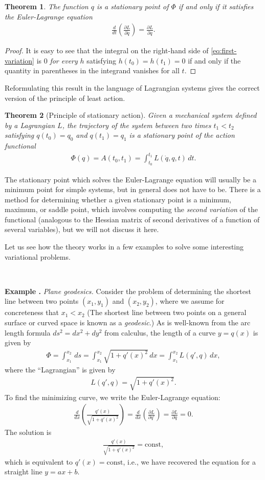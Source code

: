 \documentclass[12pt]{amsart}
\newcommand{\eqst}[1]{\begin{align*}#1\end{align*}}
\newcommand{\der}[2]{\frac{d#1}{d#2}}
\newcommand{\pder}[2]{\frac{\partial#1}{\partial#2}}
\newtheorem{thm}{Theorem}
\newcounter{example}
\newcommand{\beginexample}[1]{\ \\ \addtocounter{example}{1} \textbf{Example \arabic{example}.} \textit{#1.}}
\begin{document}
\begin{thm}
The function $q$ is a stationary point of $\Phi$ if and only if it satisfies the Euler-Lagrange equation
\eqst{
\frac{d}{dt}\left( \frac{\partial L}{\partial \dot{q}} \right) = \frac{\partial L}{\partial q}.
}
\end{thm}

\begin{proof}
It is easy to see that the integral on the right-hand side of 
\eqref{eq:first-variation} is $0$ \emph{for every} $h$ satisfying $h(t_0)=h(t_1)=0$ if and only if the quantity in parentheses in the integrand vanishes for all $t$.
\end{proof}

Reformulating this result in the language of Lagrangian systems gives the correct version of the principle of least action.

\begin{thm}[Principle of stationary action]
Given a mechanical system defined by a Lagrangian $L$, the trajectory of the system between two times $t_1<t_2$ satisfying $q(t_0)=q_0$ and $q(t_1)=q_1$ is a stationary point of the action functional
\eqst{
\Phi(q) = A(t_0,t_1) = \int_{t_0}^{t_1} L(\dot{q},q,t)\,dt.
}
\end{thm}

The stationary point which solves the Euler-Lagrange equation will usually be a minimum point for simple systems, but in general does not have to be. There is a method for determining whether a given stationary point is a minimum, maximum, or saddle point, which involves computing the \emph{second variation} of the functional (analogous to the Hessian matrix of second derivatives of a function of several variables), but we will not discuss it here.

Let us see how the theory works in a few examples to solve some interesting variational problems.

\beginexample{Plane geodesics} Consider the problem of determining the shortest line between two points $(x_1,y_1)$ and $(x_2,y_2)$, where we assume for concreteness that $x_1<x_2$ (The shortest line between two points on a general surface or curved space is known as a \emph{geodesic}.) As is well-known from the arc length formula $ds^2=dx^2+dy^2$ from calculus, the length of a curve $y=q(x)$ is given by
\eqst{ 
\Phi = \int_{x_1}^{x_2} \,ds = \int_{x_1}^{x_2} \sqrt{1+q'(x)^2}\,dx 
= \int_{x_1}^{x_2} L(q',q)\,dx, 
}
where the ``Lagrangian'' is given by
\eqst{ 
L(q',q) = \sqrt{1+q'(x)^2}.
}
To find the minimizing curve, we write the Euler-Lagrange equation:
\eqst{
\der{}{x} \left(\frac{q'(x)}{\sqrt{1+q'(x)^2}}\right) = \der{}{x}\left( \pder{L}{q'} \right) = \pder{L}{q} = 0.
}
The solution is
\eqst{ 
\frac{q'(x)}{\sqrt{1+q'(x)^2}} = \textrm{const},
}
which is equivalent to $q'(x)=\textrm{const}$, i.e., we have recovered the equation for a straight line $y=ax+b$.
\end{document}
